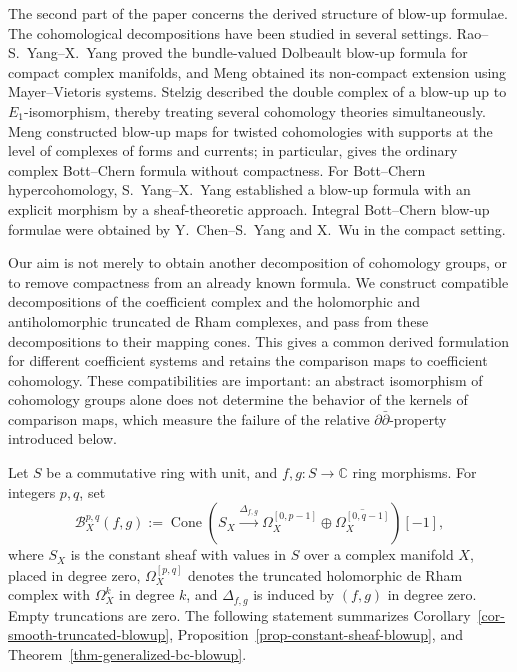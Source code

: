 \documentclass[11pt]{amsart}
\numberwithin{equation}{section}
\theoremstyle{plain}
\theoremstyle{definition}
\begin{document}
The second part of the paper concerns the derived structure of blow-up
formulae.  The cohomological decompositions have been studied in several
settings.  Rao--S.~Yang--X.~Yang \cite[Theorem 1.2]{RYY20} proved the
bundle-valued Dolbeault blow-up formula for compact complex manifolds,
and Meng \cite[Theorem 6.6]{Mn19MV} obtained its non-compact extension
using Mayer--Vietoris systems.  Stelzig \cite[\S~5]{Se21} described the double
complex of a blow-up up to $E_1$-isomorphism, thereby treating several
cohomology theories simultaneously.  Meng \cite[\S\S~4 and~5]{Mn20BC} constructed
blow-up maps for twisted cohomologies with supports at the level of
complexes of forms and currents; in particular, 
\cite[Proposition 4.15]{Mn20BC} gives the ordinary complex Bott--Chern
formula without compactness.  For Bott--Chern hypercohomology,
S.~Yang--X.~Yang \cite[Theorem 3.7]{SY} established a blow-up formula with an
explicit morphism by a sheaf-theoretic approach.  Integral Bott--Chern
blow-up formulae were obtained by Y.~Chen--S.~Yang \cite[Theorem 1.2]{CSY} and
X.~Wu \cite[Proposition 12]{Wu} in the compact setting.

Our aim is not merely to obtain another decomposition of cohomology
groups, or to remove compactness from an already known formula.  We
construct compatible decompositions of the coefficient complex and the
holomorphic and antiholomorphic truncated de Rham complexes, and pass
from these decompositions to their mapping cones.  This gives a common
derived formulation for different coefficient systems and retains the
comparison maps to coefficient cohomology.  These compatibilities are
important: an abstract isomorphism of cohomology groups alone does not
determine the behavior of the kernels of comparison maps, which measure
the failure of the relative $\partial\bar\partial$-property introduced
below.

Let $S$ be a commutative ring with unit, and
$f,g:S\longrightarrow\mathbb C$ ring morphisms.  For integers $p,q$, set
\[
\mathcal B_X^{p,q}(f,g):=
\operatorname{Cone}\!\left(S_X\xrightarrow{\Delta_{f,g}}
\Omega_X^{[0,p-1]}\oplus\overline{\Omega_X^{[0,q-1]}}\right)[-1],
\]
where $S_X$ is the constant sheaf with values in $S$ over a complex manifold $X$, placed in degree zero,
$\Omega_X^{[p,q]}$ denotes the truncated holomorphic de Rham complex
with $\Omega_X^k$ in degree $k$, and $\Delta_{f,g}$ is induced by
$(f,g)$ in degree zero.  Empty truncations are zero.  The following
statement summarizes Corollary~\ref{cor-smooth-truncated-blowup},
Proposition~\ref{prop-constant-sheaf-blowup}, and
Theorem~\ref{thm-generalized-bc-blowup}.
\end{document}
